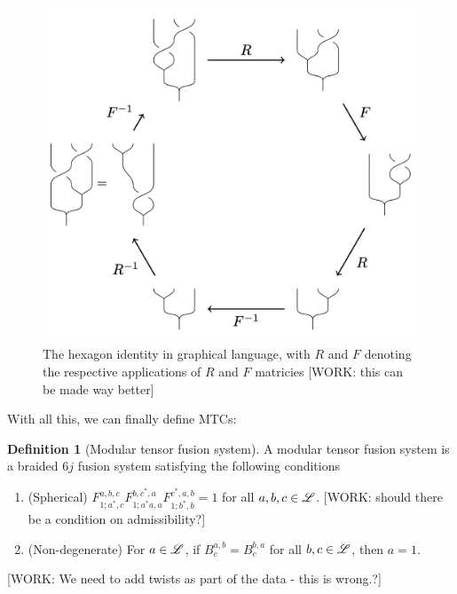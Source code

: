 \documentclass{article}
\theoremstyle{definition}
\newtheorem*{definition}{Definition}
\numberwithin{figure}{section}
\begin{document}
\begin{figure}
\begin{center}
\includegraphics[scale=0.25]{hexagon}
\caption{ The hexagon identity in graphical language, with $R$ and $F$ denoting the respective applications of $R$ and $F$ matricies [WORK: this can be made way better]}
\label{fig:hexagon}
\end{center}
\end{figure}

With all this, we can finally define MTCs:

\begin{definition}[Modular tensor fusion system] A modular tensor fusion system is a braided $6j$ fusion system satisfying the following conditions

\begin{enumerate}

\item (Spherical) $F^{a,b,c}_{1;a^*,c}F^{b,c^*,a}_{1;a^*a,a}F^{c^*,a,b}_{1;b^*,b}=1$ for all $a,b,c\in \mathscr{L}$. [WORK: should there be a condition on admissibility?]

\item (Non-degenerate) For $a\in \mathscr{L}$, if $B_c^{a,b}=B_c^{b,a}$ for all $b,c\in \mathscr{L}$, then $a=1$.
\end{enumerate}

[WORK: We need to add twists as part of the data - this is wrong.?]

\raggedleft\qedsymbol{}
\end{definition}
\end{document}
